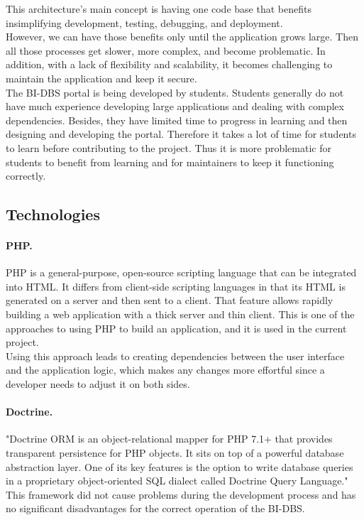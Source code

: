 \noindent This architecture's main concept is having one code base that benefits in\newline simplifying development, testing, debugging, and deployment.\\
However, we can have those benefits only until the application grows large. Then all those processes get slower, more complex, and become problematic. In addition, with a lack of flexibility and scalability, it becomes challenging to maintain the application and keep it secure.\\

\noindent The BI-DBS portal is being developed by students. Students generally do not have much experience developing large applications and dealing with complex dependencies. Besides, they have limited time to progress in learning and then designing and developing the portal. Therefore it takes a lot of time for students to learn before contributing to the project. Thus it is more problematic for students to benefit from learning and for maintainers to keep it functioning correctly.




\subsection{Technologies}
\paragraph*{PHP.} PHP is a general-purpose, open-source scripting language that can be integrated into HTML.\cite{php-doc}\cite{html-doc} It differs from client-side scripting languages in that its HTML is generated on a server and then sent to a client. That feature allows rapidly building a web application with a thick server and thin client. This is one of the approaches to using PHP to build an application, and it is used in the current project. \\
Using this approach leads to creating dependencies between the user interface and the application logic, which makes any changes more effortful since a developer needs to adjust it on both sides.

\paragraph*{Doctrine.} "Doctrine ORM is an object-relational mapper for PHP 7.1+ that provides transparent persistence for PHP objects. It sits on top of a powerful database abstraction layer. One of its key features is the option to write database queries in a proprietary object-oriented SQL dialect called Doctrine Query Language."\cite{doctrine-doc}\\ 
This framework did not cause problems during the development process and has no significant disadvantages for the correct operation of the BI-DBS.

